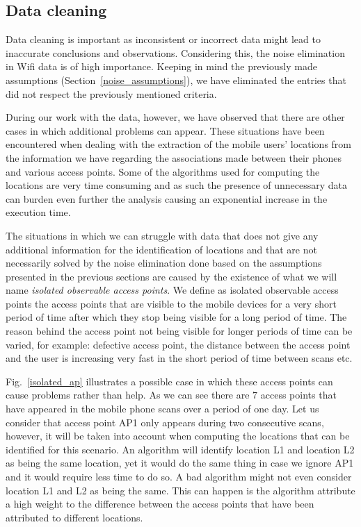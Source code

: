 \subsection{Data cleaning}
\label{data_cleaning}
Data cleaning is important as inconsistent or incorrect data might lead to
inaccurate conclusions and observations. Considering this, the noise elimination
in Wifi data is of high importance. Keeping in mind the previously made
assumptions (Section~\ref{noise_assumptions}), we have eliminated the entries
that did not respect the previously mentioned criteria. 

During our work  with the data, however, we have observed that there are
other cases in which additional problems can appear. These situations have
been encountered when dealing with the extraction of the mobile users' locations
from the information we have regarding the associations made between their
phones and various access points. Some of the algorithms used for computing the
locations are very time consuming and as such the presence of unnecessary data
can burden even further the analysis causing an exponential increase in the
execution time.

The situations in which we can struggle with data that does not give any
additional information for the identification of locations and that are not
necessarily solved by the noise elimination done based on the assumptions
presented in the previous sections are caused by the existence of what we will
name \textit{isolated observable access points}. We define as isolated
observable access points the access points that are visible to the mobile
devices for a very short period of time after which they stop being visible for
a long period of time. The reason behind the access point not being visible for
longer periods of time can be varied, for example: defective access point, the
distance between the access point and the user is increasing very fast in the
short period of time between scans etc. 

Fig.~\ref{isolated_ap} illustrates a possible case in which these access points
can cause problems rather than help. As we can see there are $7$ access points
that have appeared in the mobile phone scans over a period of one day. Let us
consider that access point AP1 only appears during two consecutive scans,
however, it will be taken into account when computing the locations that can be
identified for this scenario. An algorithm will identify location L1 and
location L2 as being the same location, yet it would do the same thing in case
we ignore AP1 and it would require less time to do so. A bad algorithm might not
even consider location L1 and L2 as being the same. This can happen is the
algorithm attribute a high weight to the difference between the access points
that have been attributed to different locations.

